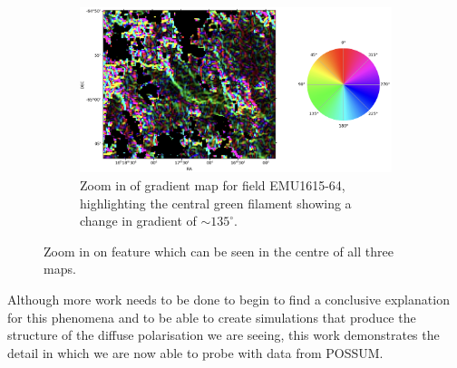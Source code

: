 \begin{figure}
\begin{subfigure}[b]{0.6\textwidth}
        \label{fig: 1615 rm zoom}
    \end{subfigure}
    \begin{subfigure}[b]{0.7\textwidth}
        \includegraphics[width=\linewidth]{Thesis_Template/Figures/1615_grad_zoom.png}
        \caption{Zoom in of gradient map for field EMU1615-64, highlighting the central green filament showing a change in gradient of $\sim 135^\circ$.}
        \label{fig: 1615 grad zoom}
    \end{subfigure}
    \caption{Zoom in on feature which can be seen in the centre of all three maps.}
    \label{fig: 1615 zoom}
\end{figure}


Although more work needs to be done to begin to find a conclusive explanation for this phenomena and to be able to create simulations that produce the structure of the diffuse polarisation we are seeing, this work demonstrates the detail in which we are now able to probe with data from POSSUM.


